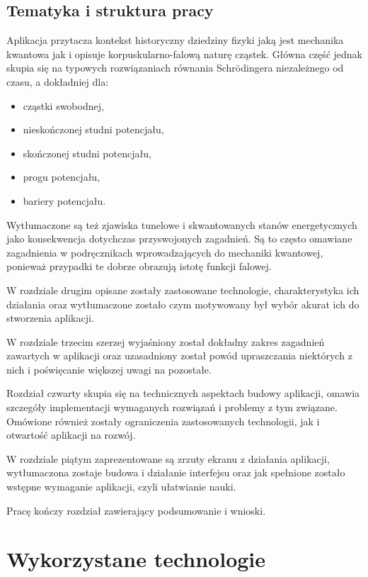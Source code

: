 \documentclass{SGGW-thesis}
\begin{document}
	\section{Tematyka i struktura pracy}
	Aplikacja przytacza kontekst historyczny dziedziny fizyki jaką jest mechanika kwantowa jak i opisuje korpuskularno-falową naturę cząstek. Główna część jednak skupia się na typowych rozwiązaniach równania Schrödingera niezależnego od czasu, a dokładniej dla:
	\begin{itemize}
	\item cząstki swobodnej,
	\item nieskończonej studni potencjału,
	\item skończonej studni potencjału,
	\item progu potencjału,
	\item bariery potencjału.
	\end{itemize}
	
	Wytłumaczone są też zjawiska tunelowe i skwantowanych stanów energetycznych jako konsekwencja dotychczas przyswojonych zagadnień. Są to często omawiane zagadnienia w podręcznikach wprowadzających do mechaniki kwantowej\cite{kolejnosc nauki}, ponieważ przypadki te dobrze obrazują istotę funkcji falowej.
	
	W rozdziale drugim opisane zostały zastosowane technologie, charakterystyka ich działania oraz wytłumaczone zostało czym motywowany był wybór akurat ich do stworzenia aplikacji.
	
	W rozdziale trzecim szerzej wyjaśniony został dokładny zakres zagadnień zawartych w aplikacji oraz uzasadniony został powód upraszczania niektórych z nich i poświęcanie większej uwagi na pozostałe.
	
	Rozdział czwarty skupia się na technicznych aspektach budowy aplikacji, omawia szczegóły implementacji wymaganych rozwiązań i problemy z tym związane. Omówione również zostały ograniczenia zastosowanych technologii, jak i otwartość aplikacji na rozwój.
	
	W rozdziale piątym zaprezentowane są zrzuty ekranu z działania aplikacji, wytłumaczona zostaje budowa i działanie interfejsu oraz jak spełnione zostało wstępne wymaganie aplikacji, czyli ułatwianie nauki.
	
	Pracę kończy rozdział zawierający podsumowanie i wnioski.
	
	
\chapter{Wykorzystane technologie}
\end{document}

